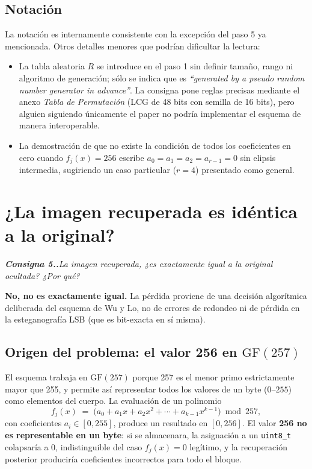\documentclass[11pt,a4paper]{article}
\newcommand{\pregunta}[1]{%
    \begingroup
    \itshape\small\color{gray!30!black}\textbf{Consigna 5.\arabic{section}.}\enspace #1\par\medskip
    \endgroup
}
\begin{document}
\subsection*{Notación}

La notación es internamente consistente con la excepción del paso 5 ya
mencionada. Otros detalles menores que podrían dificultar la lectura:
\begin{itemize}[leftmargin=*,nosep]
    \item La tabla aleatoria $R$ se introduce en el paso 1 sin definir
          tamaño, rango ni algoritmo de generación; sólo se indica que es
          \emph{``generated by a pseudo random number generator in
          advance''}. La consigna pone reglas precisas mediante el anexo
          \emph{Tabla de Permutación} (LCG de 48 bits con semilla de
          16 bits), pero alguien siguiendo únicamente el paper no podría
          implementar el esquema de manera interoperable.
    \item La demostración de que no existe la condición de todos los
          coeficientes en cero cuando $f_j(x)=256$ escribe
          $a_0 = a_1 = a_2 = a_{r-1} = 0$ sin elipsis intermedia,
          sugiriendo un caso particular ($r=4$) presentado como general.
\end{itemize}

\section{¿La imagen recuperada es idéntica a la original?}\label{sec:lossy}
\pregunta{La imagen recuperada, ¿es exactamente igual a la original ocultada?
¿Por qué?}

\textbf{No, no es exactamente igual.} La pérdida proviene de una decisión
algorítmica deliberada del esquema de Wu y Lo, no de errores de redondeo ni
de pérdida en la esteganografía LSB (que es bit-exacta en sí misma).

\subsection*{Origen del problema: el valor 256 en $\mathrm{GF}(257)$}

El esquema trabaja en $\mathrm{GF}(257)$ porque 257 es el menor primo
estrictamente mayor que 255, y permite así representar todos los valores de
un byte ($0$--$255$) como elementos del cuerpo. La evaluación de un
polinomio
\[
    f_j(x) \;=\; \bigl(a_0 + a_1 x + a_2 x^2 + \cdots + a_{k-1} x^{k-1}\bigr)\bmod 257,
\]
con coeficientes $a_i \in [0,255]$, produce un resultado en $[0,256]$. El
valor \textbf{256 no es representable en un byte}: si se almacenara, la
asignación a un \texttt{uint8\_t} colapsaría a 0, indistinguible del caso
$f_j(x)=0$ legítimo, y la recuperación posterior produciría coeficientes
incorrectos para todo el bloque.
\end{document}
